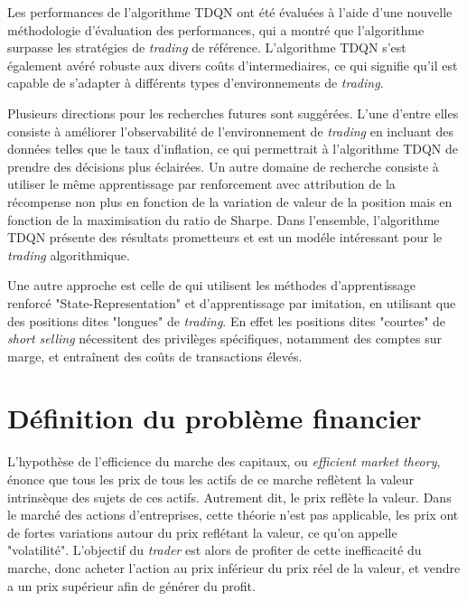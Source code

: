 \documentclass[twocolumn]{article}
\begin{document}
Les performances de l'algorithme TDQN ont été évaluées à l'aide d'une nouvelle méthodologie d'évaluation des performances, qui a montré que l'algorithme surpasse les stratégies de \textit{trading} de référence. L'algorithme TDQN s'est également avéré robuste aux divers coûts d'intermediaires, ce qui signifie qu'il est capable de s'adapter à différents types d'environnements de \textit{trading}.
\newline

Plusieurs directions pour les recherches futures sont sugg\'er\'ees. L'une d'entre elles consiste à améliorer l'observabilité de l'environnement de \textit{trading} en incluant des donn\'ees telles que le taux d'inflation, ce qui permettrait à l'algorithme TDQN de prendre des décisions plus éclairées. Un autre domaine de recherche consiste à utiliser le m\^eme apprentissage par renforcement avec attribution de la r\'ecompense non plus en fonction de la variation de valeur de la position mais en fonction de la maximisation du ratio de Sharpe. Dans l'ensemble, l'algorithme TDQN présente des résultats prometteurs et est un mod\'ele int\'eressant pour le \textit{trading} algorithmique.
\newline

Une autre approche est celle de \cite{park_practical_2021} qui utilisent les m\'ethodes d'apprentissage renforc\'e "State-Representation" et d'apprentissage par imitation, en utilisant que des positions dites "longues" de \textit{trading}. En effet les positions dites "courtes" de \textit{short selling} n\'ecessitent des privil\`eges sp\'ecifiques, notamment des comptes sur marge, et entra\^inent des co\^uts de transactions \'elev\'es.
\newline


\section{Définition du problème financier}

L'hypothèse de l'efficience du marche des capitaux, ou \textit{efficient market theory}, énonce que tous les prix de tous les actifs de ce marche reflètent la valeur intrinsèque des sujets de ces actifs. Autrement dit, le prix reflète la valeur. Dans le march\'e des actions d'entreprises, cette théorie n'est pas applicable, les prix ont de fortes variations autour du prix reflétant la valeur, ce qu'on appelle "volatilité".
L'objectif du \textit{trader} est alors de profiter de cette inefficacité du marche, donc acheter l'action au prix inférieur du prix réel de la valeur, et vendre a un prix supérieur afin de générer du profit.
\newline
\end{document}
